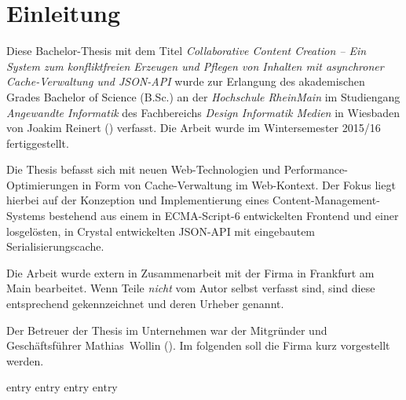 \chapter{Einleitung}
\label{chap:einleitung}

Diese Bachelor-Thesis mit dem Titel \emph{Collaborative Content Creation -- Ein
System zum konfliktfreien Erzeugen und Pflegen von Inhalten mit asynchroner
Cache-Verwaltung und JSON-API} wurde zur Erlangung des akademischen Grades
Bachelor of Science (B.Sc.) an der \emph{Hochschule RheinMain} im Studiengang
\emph{Angewandte Informatik} des Fachbereichs \emph{Design Informatik Medien}
in Wiesbaden von Joakim Reinert () verfasst.  Die
Arbeit wurde im Wintersemester 2015/16 fertiggestellt.

Die Thesis befasst sich mit neuen Web-Technologien und
Performance-Optimierungen in Form von Cache-Verwaltung im Web-Kontext.  Der
Fokus liegt hierbei auf der Konzeption und Implementierung eines
Content-Management-Systems bestehend aus einem in ECMA-Script-6 entwickelten
Frontend und einer losgelösten, in Crystal entwickelten JSON-API mit
eingebautem Serialisierungscache.

Die Arbeit wurde extern in Zusammenarbeit mit der Firma \emph{\mesods} in
Frankfurt am Main bearbeitet.  Wenn Teile \emph{nicht} vom Autor selbst
verfasst sind, sind diese entsprechend gekennzeichnet und deren Urheber
genannt.

Der Betreuer der Thesis im Unternehmen war der Mitgründer und Geschäftsführer
\mbox{Mathias Wollin} ().  Im folgenden soll die Firma
kurz vorgestellt werden.

{entry}
{entry}
{entry}
{entry}
